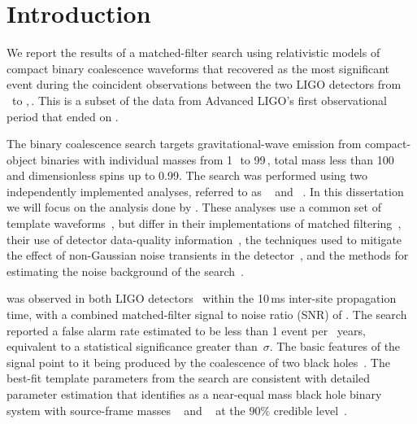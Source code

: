 
\section{Introduction}
\label{s:intro}
We report the results of a matched-filter
search using relativistic models of compact binary coalescence waveforms that
recovered \TheEvent{} as the most significant event during the coincident
observations between the two LIGO detectors from \OBSSTART\ to
\OBSEND,\,\OBSYEAR. This is a subset of the data from Advanced LIGO's first
observational period that ended on \OoneEND. 

The binary coalescence search targets gravitational-wave emission from
compact-object binaries with individual masses from 1$\,$\Msun\, to
99$\,$\Msun, total mass less than 100$\,$\Msun\, and dimensionless spins up to
0.99. The search was performed using two independently implemented analyses,
referred to as \pycbc{}~\cite{Canton:2014ena,Usman:2015kfa,pycbc-github} and
\gstlal{}~\cite{Cannon:2011vi,Privitera:2013xza,gstlal-methods}.  In this
dissertation we will focus on the analysis done by \pycbc{}. These
analyses use a common set of template
waveforms~\cite{Taracchini:2013rva,Purrer:2015tud,Capano:2016uif}, but differ
in their implementations of matched
filtering~\cite{Allen:2005fk,Cannon:2010qh}, their use of detector
data-quality information~\cite{GW150914-DETCHAR}, the techniques used to
mitigate the effect of non-Gaussian noise transients in the
detector~\cite{Allen:2004gu,Cannon:2011vi}, and the methods for estimating the
noise background of the search~\cite{Usman:2015kfa,Cannon:2015gha}.  

\TheEvent{} was observed in both LIGO detectors~\cite{GW150914-DETECTORS}
within the 10\,ms inter-site propagation time, with a combined matched-filter
signal to noise ratio (SNR) of \OBSEVENTAPPROXCOMBINEDSNR.  The search
reported a false alarm rate estimated to be less than 1 event per
\CBCEVENTIFAR~years, equivalent to a statistical significance greater than
\CBCEVENTSIGMA\,$\sigma$.  The basic features of the \TheEvent{} signal point
to it being produced by the coalescence of two black
holes~\cite{GW150914-DETECTION}.  The best-fit template parameters from the
search are consistent with detailed parameter estimation that identifies
\TheEvent{} as a near-equal mass black hole binary system with source-frame
masses {\MONESCOMPACT~\Msun} and {\MTWOSCOMPACT~\Msun} at the $90\%$ credible
level~\cite{GW150914-PARAMESTIM}.

